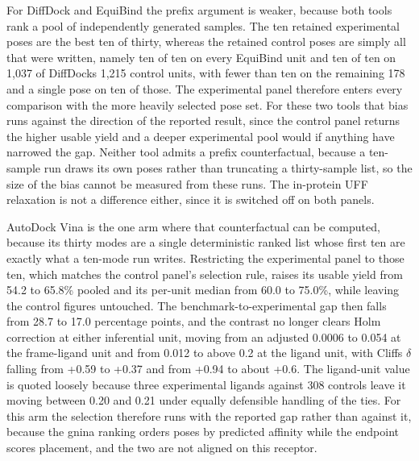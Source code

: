 For DiffDock and EquiBind the prefix argument is weaker, because both tools rank a pool of independently generated samples. The ten retained experimental poses are the best ten of thirty, whereas the retained control poses are simply all that were written, namely ten of ten on every EquiBind unit and ten of ten on 1,037 of DiffDock\textquotesingle s 1,215 control units, with fewer than ten on the remaining 178 and a single pose on ten of those. The experimental panel therefore enters every comparison with the more heavily selected pose set. For these two tools that bias runs against the direction of the reported result, since the control panel returns the higher usable yield and a deeper experimental pool would if anything have narrowed the gap. Neither tool admits a prefix counterfactual, because a ten-sample run draws its own poses rather than truncating a thirty-sample list, so the size of the bias cannot be measured from these runs. The in-protein UFF relaxation is not a difference either, since it is switched off on both panels.

AutoDock Vina is the one arm where that counterfactual can be computed, because its thirty modes are a single deterministic ranked list whose first ten are exactly what a ten-mode run writes. Restricting the experimental panel to those ten, which matches the control panel's selection rule, raises its usable yield from 54.2 to 65.8\% pooled and its per-unit median from 60.0 to 75.0\%, while leaving the control figures untouched. The benchmark-to-experimental gap then falls from 28.7 to 17.0 percentage points, and the contrast no longer clears Holm correction at either inferential unit, moving from an adjusted 0.0006 to 0.054 at the frame-ligand unit and from 0.012 to above 0.2 at the ligand unit, with Cliff\textquotesingle s \ensuremath{\delta} falling from +0.59 to +0.37 and from +0.94 to about +0.6. The ligand-unit value is quoted loosely because three experimental ligands against 308 controls leave it moving between 0.20 and 0.21 under equally defensible handling of the ties. For this arm the selection therefore runs with the reported gap rather than against it, because the gnina ranking orders poses by predicted affinity while the endpoint scores placement, and the two are not aligned on this receptor.

